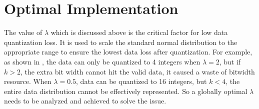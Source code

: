 \section{Optimal Implementation}\label{sec:algo}
The value of $\lambda$ which is discussed above is the critical factor for low data quantization loss. 
It is used to scale the standard normal distribution to the appropriate range to ensure the lowest data loss after quantization. For example, as shown in , the data can only be quantized to 4 integers when $\lambda=2$, but if $k>2$, the extra bit width cannot hit the valid data, it caused a waste of bitwidth resource.
When $\lambda=0.5$, data can be quantized to 16 integers, but $k < 4$, the entire data distribution cannot be effectively represented.
So a globally optimal $\lambda$ needs to be analyzed and achieved to solve the issue.


